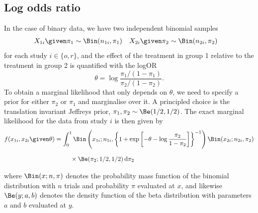 \subsection{Log odds ratio}
In the case of binary data, we have two independent binomial samples
\begin{align*}
  &X_{1i} \given \pi_1 \sim \Bin(n_{1i}, \pi_1)&
  &X_{2i} \given \pi_2 \sim \Bin(n_{2i}, \pi_2)&
\end{align*}
for each study $i \in \{o, r\}$, and the effect of the treatment in group 1
relative to the treatment in group 2 is quantified with the logOR
$$\theta = \log \frac{\pi_1/(1 - \pi_1)}{\pi_2/(1 - \pi_2)}.$$
To obtain a marginal likelihood that only depends on $\theta$, we need to
specify a prior for either $\pi_2$ or $\pi_1$ and marginalise over it. A
principled choice is the translation invariant Jeffreys prior,
$\pi_1, \pi_2 \sim \Be(1/2, 1/2)$. The exact marginal likelihood for the data
from study $i$ is then given by
\begin{align}
  \label{eq2:binexact}
  f(x_{1i}, x_{2i} \given \theta)
  &= \int_0^1 \Bin\left(x_{1i}; n_{1i}, \left\{1 + \exp\left[-\theta - \log
    \frac{\pi_2}{1 - \pi_2}\right]\right\}^{-1}\right) \Bin(x_{2i}; n_{2i}, \pi_2)
  \nonumber
  \\ &\phantom{= \int_0^1}  \times \Be(\pi_2; 1/2, 1/2) \, \text{d} \pi_2
\end{align}
where $\Bin(x; n, \pi)$ denotes the probability mass function of the binomial
distribution with $n$ trials and probability $\pi$ evaluated at $x$, and
likewise $\Be(y; a, b)$ denotes the density function of the beta distribution
with parameters $a$ and $b$ evaluated at $y$.

